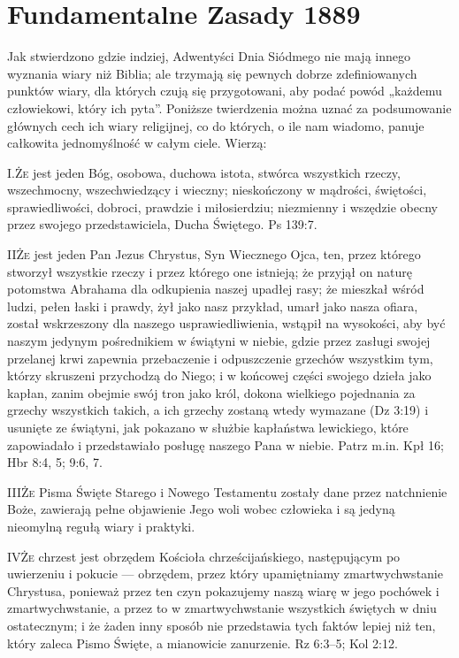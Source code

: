  \label{chap:appendix} 


\section*{Fundamentalne Zasady 1889}

Jak stwierdzono gdzie indziej, Adwentyści Dnia Siódmego nie mają innego wyznania wiary niż Biblia; ale trzymają się pewnych dobrze zdefiniowanych punktów wiary, dla których czują się przygotowani, aby podać powód „każdemu człowiekowi, który ich pyta”. Poniższe twierdzenia można uznać za podsumowanie głównych cech ich wiary religijnej, co do których, o ile nam wiadomo, panuje całkowita jednomyślność w całym ciele. Wierzą:

\lettrine{I.}{Że} jest jeden Bóg, osobowa, duchowa istota, stwórca wszystkich rzeczy, wszechmocny, wszechwiedzący i wieczny; nieskończony w mądrości, świętości, sprawiedliwości, dobroci, prawdzie i miłosierdziu; niezmienny i wszędzie obecny przez swojego przedstawiciela, Ducha Świętego. Ps 139:7.

\lettrine{II}{Że} jest jeden Pan Jezus Chrystus, Syn Wiecznego Ojca, ten, przez którego stworzył wszystkie rzeczy i przez którego one istnieją; że przyjął on naturę potomstwa Abrahama dla odkupienia naszej upadłej rasy; że mieszkał wśród ludzi, pełen łaski i prawdy, żył jako nasz przykład, umarł jako nasza ofiara, został wskrzeszony dla naszego usprawiedliwienia, wstąpił na wysokości, aby być naszym jedynym pośrednikiem w świątyni w niebie, gdzie przez zasługi swojej przelanej krwi zapewnia przebaczenie i odpuszczenie grzechów wszystkim tym, którzy skruszeni przychodzą do Niego; i w końcowej części swojego dzieła jako kapłan, zanim obejmie swój tron jako król, dokona wielkiego pojednania za grzechy wszystkich takich, a ich grzechy zostaną wtedy wymazane (Dz 3:19) i usunięte ze świątyni, jak pokazano w służbie kapłaństwa lewickiego, które zapowiadało i przedstawiało posługę naszego Pana w niebie. Patrz m.in. Kpł 16; Hbr 8:4, 5; 9:6, 7.

\lettrine{III}{Że} Pisma Święte Starego i Nowego Testamentu zostały dane przez natchnienie Boże, zawierają pełne objawienie Jego woli wobec człowieka i są jedyną nieomylną regułą wiary i praktyki.

\lettrine{IV}{Że} chrzest jest obrzędem Kościoła chrześcijańskiego, następującym po uwierzeniu i pokucie — obrzędem, przez który upamiętniamy zmartwychwstanie Chrystusa, ponieważ przez ten czyn pokazujemy naszą wiarę w jego pochówek i zmartwychwstanie, a przez to w zmartwychwstanie wszystkich świętych w dniu ostatecznym; i że żaden inny sposób nie przedstawia tych faktów lepiej niż ten, który zaleca Pismo Święte, a mianowicie zanurzenie. Rz 6:3--5; Kol 2:12.

